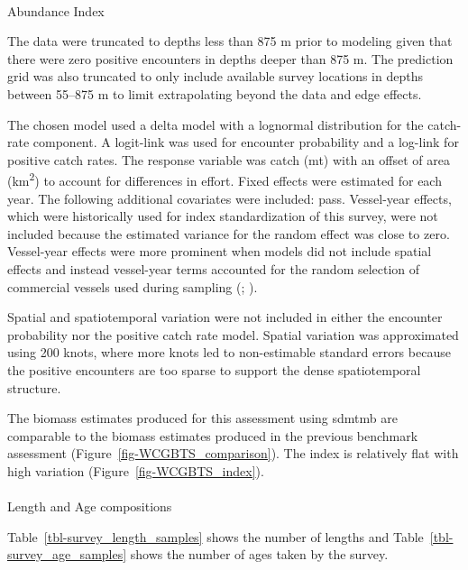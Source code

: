 \documentclass[
]{scrartcl}
\makeatletter
\let\oldparagraph\paragraph
\renewcommand{\paragraph}{
    \@ifstar
      \xxxParagraphStar
      \xxxParagraphNoStar
  }
\newcommand{\xxxParagraphStar}[1]{\oldparagraph*{#1}\mbox{}}
\newcommand{\xxxParagraphNoStar}[1]{\oldparagraph{#1}\mbox{}}
\makeatother
\begin{document}
\paragraph{Abundance Index}\label{abundance-index}

The data were truncated to depths less than 875 m prior to modeling
given that there were zero positive encounters in depths deeper than 875
m. The prediction grid was also truncated to only include available
survey locations in depths between 55--875 m to limit extrapolating
beyond the data and edge effects.

The chosen model used a delta model with a lognormal distribution for
the catch-rate component. A logit-link was used for encounter
probability and a log-link for positive catch rates. The response
variable was catch (mt) with an offset of area (km\textsuperscript{2})
to account for differences in effort. Fixed effects were estimated for
each year. The following additional covariates were included: pass.
Vessel-year effects, which were historically used for index
standardization of this survey, were not included because the estimated
variance for the random effect was close to zero. Vessel-year effects
were more prominent when models did not include spatial effects and
instead vessel-year terms accounted for the random selection of
commercial vessels used during sampling
(;
).

Spatial and spatiotemporal variation were not included in either the
encounter probability nor the positive catch rate model. Spatial
variation was approximated using 200 knots, where more knots led to
non-estimable standard errors because the positive encounters are too
sparse to support the dense spatiotemporal structure.

The biomass estimates produced for this assessment using \gls{sdmtmb}
are comparable to the biomass estimates produced in the previous
benchmark assessment (Figure~\ref{fig-WCGBTS_comparison}). The index is
relatively flat with high variation (Figure~\ref{fig-WCGBTS_index}).

\paragraph{Length and Age
compositions}\label{length-and-age-compositions}

Table~\ref{tbl-survey_length_samples} shows the number of lengths and
Table~\ref{tbl-survey_age_samples} shows the number of ages taken by the
survey.
\end{document}
